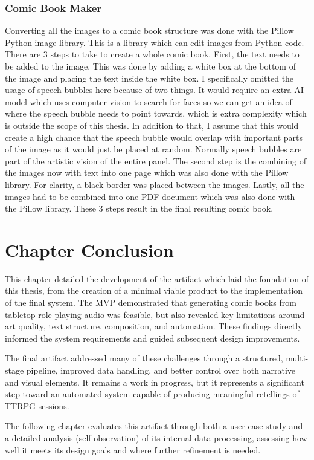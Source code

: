 \subsubsection*{Comic Book Maker}
Converting all the images to a comic book structure was done with the Pillow Python image library. This is a library which can edit images from Python code. There are 3 steps to take to create a whole comic book. First, the text needs to be added to the image. This was done by adding a white box at the bottom of the image and placing the text inside the white box. I specifically omitted the usage of speech bubbles here because of two things. It would require an extra AI model which uses computer vision to search for faces so we can get an idea of where the speech bubble needs to point towards, which is extra complexity which is outside the scope of this thesis. In addition to that, I assume that this would create a high chance that the speech bubble would overlap with important parts of the image as it would just be placed at random. Normally speech bubbles are part of the artistic vision of the entire panel. The second step is the combining of the images now with text into one page which was also done with the Pillow library. For clarity, a black border was placed between the images. Lastly, all the images had to be combined into one PDF document which was also done with the Pillow library. These 3 steps result in the final resulting comic book.

\section{Chapter Conclusion}
This chapter detailed the development of the artifact which laid the foundation of this thesis, from the creation of a minimal viable product to the implementation of the final system. The MVP demonstrated that generating comic books from tabletop role-playing audio was feasible, but also revealed key limitations around art quality, text structure, composition, and automation. These findings directly informed the system requirements and guided subsequent design improvements.

The final artifact addressed many of these challenges through a structured, multi-stage pipeline, improved data handling, and better control over both narrative and visual elements. It remains a work in progress, but it represents a significant step toward an automated system capable of producing meaningful retellings of TTRPG sessions.

The following chapter evaluates this artifact through both a user-case study and a detailed analysis (self-observation) of its internal data processing, assessing how well it meets its design goals and where further refinement is needed.